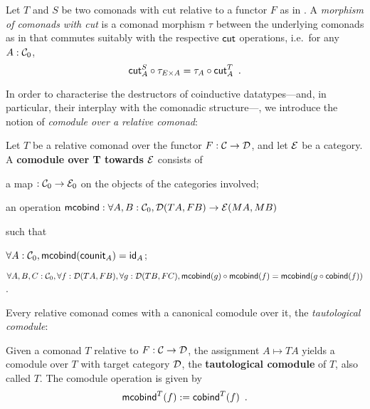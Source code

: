 \documentclass{amsart}
\newcommand{\fat}[1]{\textbf{#1}}
\begin{document}
\begin{definition}\label{def:morphism_comonad_cut}
 Let $T$ and $S$ be two comonads with cut relative to a functor $F$ as in .
 A \emph{morphism of comonads with cut} is a comonad morphism $\tau$ between the underlying comonads as in  that 
 commutes suitably with the respective $\cut$ operations, i.e.\ for any $A : \C_0$,
  \[ \comp{\tau_{E \times A}}{\cut^S_A}  = \comp{\cut^T_A}{\tau_A} \enspace . \]
\end{definition}





In order to characterise the destructors of coinductive datatypes---and, in particular, their interplay with the comonadic structure---, 
we introduce the notion of \emph{comodule
over a relative comonad}:

\begin{definition}\label{def:comodule}
 Let $T$ be a relative comonad over the functor $F:\C\to\D$, and let $\E$ be a category.
 A \fat{comodule over T towards $\E$} consists of
   \begin{packitem}
   \item a map $:\C_0 \to \E_0$ on the objects of the categories involved;
   \item an operation $\mcobind: \forall A,B:\C_0, \D(TA,FB) \to \E(MA,MB)$
  \end{packitem}
  such that 
  \begin{packitem}
   \item $\forall A : \C_0, \mcobind(\counit_A) = \id_A$;
   \item $\forall A,B,C:\C_0, \forall f : \D(TA,FB),\forall g:\D(TB,FC), \\
        \comp{\mcobind(f)}{\mcobind(g)} = \mcobind(\comp{\cobind(f)}{g})$ .
  \end{packitem}

\end{definition}

Every relative comonad comes with a canonical comodule over it, the \emph{tautological comodule}:

\begin{definition}\label{def:tautological_comodule}
  Given a comonad $T$ relative to $F:\C\to\D$, the assignment $A \mapsto TA$ yields a comodule over $T$ 
  with target category $\D$, the \textbf{tautological comodule} of $T$, also called $T$.
  The comodule operation is given by
    \[  \mcobind^T(f) := \cobind^T(f) \enspace . \]
\end{definition}
\end{document}
